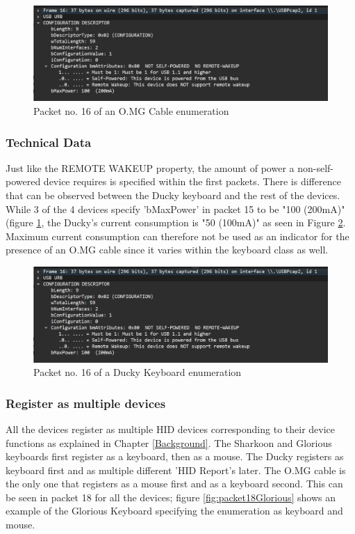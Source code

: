 \begin{figure}[H]
    \centering
    \includegraphics[width=0.75\linewidth]{visuals/no-remote-wakeup-100mA.png}
    \caption{Packet no. 16 of an O.MG Cable enumeration}
    \label{fig:packet16OMG}
\end{figure}

\subsubsection{Technical Data}

Just like the REMOTE WAKEUP property, the amount of power a non-self-powered device requires is specified within the first packets. There is difference that can be observed between the Ducky keyboard and the rest of the devices. While 3 of the 4 devices specify 'bMaxPower' in packet 15 to be "100 (200mA)" (figure \ref{fig:packet16OMG}, the Ducky's current consumption is "50 (100mA)" as seen in Figure \ref{fig:packet16Ducky}. Maximum current consumption can therefore not be used as an indicator for the presence of an O.MG cable since it varies within the keyboard class as well. 


\begin{figure}[H]
    \centering
    \includegraphics[width=0.75\linewidth]{visuals/no-remote-wakeup-100mA.png}
    \caption{Packet no. 16 of a Ducky Keyboard enumeration}
    \label{fig:packet16Ducky}
\end{figure}


\subsubsection{Register as multiple devices}

All the devices register as multiple HID devices corresponding to their device functions as explained in Chapter \ref{Background}. The Sharkoon and Glorious keyboards first register as a keyboard, then as a mouse. The Ducky registers as keyboard first and as multiple different 'HID Report's later. The O.MG cable is the only one that registers as a mouse first and as a keyboard second. This can be seen in packet 18 for all the devices; figure \ref{fig:packet18Glorious} shows an example of the Glorious Keyboard specifying the enumeration as keyboard and mouse. 

